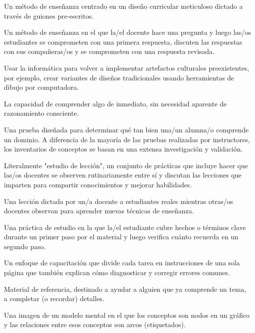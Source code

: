 \begin{description}
 Un método de enseñanza centrado
en un diseño curricular meticuloso dictado a través de guiones pre-escritos.

 Un método de enseñanza en el que la/el docente hace una pregunta y luego las/os estudiantes se comprometen con una primera respuesta, discuten las respuestas con sus compañeras/os y se comprometen con una respuesta revisada.

 Usar la informática
para volver a implementar artefactos culturales preexistentes, por ejemplo,
crear variantes de diseños tradicionales usando herramientas de dibujo por computadora.

 La capacidad de comprender algo de inmediato,
sin necesidad aparente de razonamiento consciente.

 Una prueba diseñada para determinar
qué tan bien una/un alumna/o comprende un dominio. A diferencia de la mayoría de las pruebas realizadas por instructores,
los inventarios de conceptos se basan en una extensa investigación y validación.

 Literalmente "estudio de lección", un conjunto de prácticas que incluye hacer que las/os docentes se observen rutinariamente entre sí y discutan las lecciones que imparten para compartir conocimientos y mejorar habilidades.

 Una lección dictada por un/a docente a estudiantes reales
mientras otras/os docentes observan para aprender nuevas técnicas de enseñanza.

 Una práctica de estudio
en la que la/el estudiante cubre hechos o términos clave durante un primer paso por el material y luego verifica cuánto recuerda en un segundo paso.

 Un enfoque de capacitación que divide
cada tarea en instrucciones de una sola página que también
explican cómo diagnosticar y corregir errores comunes.

 Material de referencia, destinado a ayudar a alguien que ya comprende un tema, a completar (o recordar) detalles.

 Una imagen de un modelo mental en el que
los conceptos son nodos en un gráfico y las relaciones entre esos conceptos son arcos (etiquetados).


\end{description}
